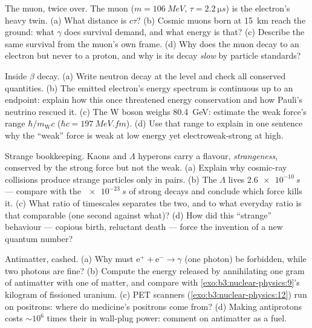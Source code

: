 \begin{exercise}[$\star\star$]\label{exo:b3:particle-physics:5}
The muon, twice over. The muon ($m = \qty{106}{MeV}$,
$\tau = \qty{2.2}{\micro s}$) is the electron's heavy twin. (a)
What distance is $c\tau$? (b) Cosmic muons born at
\qty{15}{km} reach the ground: what $\gamma$ does survival
demand, and what energy is that? (c) Describe the same survival
from the muon's own frame. (d) Why does the muon decay to an
electron but never to a proton, and why is its decay
\emph{slow} by particle standards?
\end{exercise}

\begin{exercise}[$\star\star$]\label{exo:b3:particle-physics:6}
Inside $\beta$ decay. (a) Write neutron decay at the 
level and check all conserved quantities. (b) The emitted
electron's energy spectrum is continuous up to an endpoint:
explain how this once threatened energy conservation and how
Pauli's neutrino rescued it. (c) The W boson weighs
\qty{80.4}{GeV}: estimate the weak force's range
$\hbar/m_{\text{W}}c$ ($\hbar c = \qty{197}{MeV.fm}$). (d) Use
that range to explain in one sentence why the ``weak'' force is
weak at low energy yet electroweak-strong at high.
\end{exercise}

\begin{exercise}[$\star\star$]\label{exo:b3:particle-physics:7}
Strange bookkeeping. Kaons and $\Lambda$ hyperons carry a
flavour, \emph{strangeness}, conserved by the strong force but
not the weak. (a) Explain why cosmic-ray collisions produce
strange particles only in pairs. (b) The $\Lambda$ lives
$\qty{2.6e-10}{s}$ --- compare with the $\qty{e-23}{s}$ of
strong decays and conclude which force kills it. (c) What ratio
of timescales separates the two, and to what everyday ratio is
that comparable (one second against what)? (d) How did this
``strange'' behaviour --- copious birth, reluctant death ---
force the invention of a new quantum number?
\end{exercise}

\begin{exercise}[$\star\star$]\label{exo:b3:particle-physics:8}
Antimatter, cashed. (a) Why must
$\text{e}^+ + \text{e}^- \to \gamma$ (one photon) be forbidden,
while two photons are fine? (b) Compute the energy released by
annihilating one gram of antimatter with one of matter, and
compare with \cref{exo:b3:nuclear-physics:9}'s kilogram of
fissioned uranium. (c) PET scanners
(\cref{exo:b3:nuclear-physics:12}) run on positrons: where do
medicine's positrons come from? (d) Making antiprotons costs
$\sim10^{6}$ times their  in wall-plug power: comment
on antimatter as a fuel.
\end{exercise}

